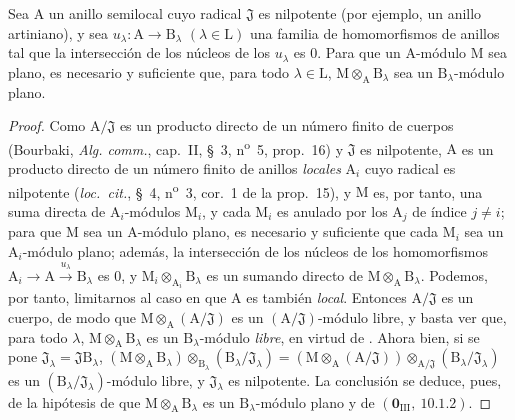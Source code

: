 \begin{corollary}[11.4.3]
\label{IV.11.4.3}
Sea $\mathrm{A}$ un anillo semilocal cuyo radical $\mathfrak{J}$ es nilpotente (por
ejemplo, un anillo artiniano), y sea $u_\lambda:\mathrm{A}\to\mathrm{B}_\lambda$ $(\lambda\in\mathrm{L})$ una familia de homomorfismos de anillos tal
que la intersección de los núcleos de los $u_\lambda$ es $0$. Para que un $\mathrm{A}$-módulo $\mathrm{M}$ sea plano, es necesario y
suficiente que, para todo $\lambda\in\mathrm{L}$, $\mathrm{M}\otimes_\mathrm{A}\mathrm{B}_\lambda$ sea un $\mathrm{B}_\lambda$-módulo plano.
\end{corollary}

\begin{proof}
Como $\mathrm{A}/\mathfrak{J}$ es un producto directo de un número finito de cuerpos (Bourbaki, \emph{Alg. comm.},
cap.~II, \S~3, n\textsuperscript{o}~5, prop.~16) y $\mathfrak{J}$ es nilpotente, $\mathrm{A}$ es un producto directo de un
número finito de anillos \emph{locales} $\mathrm{A}_i$ cuyo radical es nilpotente (\emph{loc.\ cit.}, \S~4, n\textsuperscript{o}~3, cor.~1
de la prop.~15), y $\mathrm{M}$ es, por tanto, una suma directa de $\mathrm{A}_i$-módulos $\mathrm{M}_i$, y cada $\mathrm{M}_i$ es
anulado por los $\mathrm{A}_j$ de índice $j\neq i$; para que $\mathrm{M}$ sea un $\mathrm{A}$-módulo plano, es necesario y
suficiente que cada $\mathrm{M}_i$ sea un $\mathrm{A}_i$-módulo plano; además, la intersección de los núcleos
de los homomorfismos $\mathrm{A}_i\longrightarrow\mathrm{A}\xrightarrow{u_\lambda}\mathrm{B}_\lambda$ es $0$, y $\mathrm{M}_i\otimes_{\mathrm{A}_i}\mathrm{B}_\lambda$ es un sumando directo
de $\mathrm{M}\otimes_\mathrm{A}\mathrm{B}_\lambda$. Podemos, por tanto, limitarnos al caso en que $\mathrm{A}$ es también \emph{local}. Entonces $\mathrm{A}/\mathfrak{J}$ es un
cuerpo, de modo que $\mathrm{M}\otimes_\mathrm{A}(\mathrm{A}/\mathfrak{J})$ es un $(\mathrm{A}/\mathfrak{J})$-módulo libre, y basta ver que, para
todo $\lambda$, $\mathrm{M}\otimes_\mathrm{A}\mathrm{B}_\lambda$ es un $\mathrm{B}_\lambda$-módulo \emph{libre}, en virtud de . Ahora bien, si se pone $\mathfrak{J}_\lambda=\mathfrak{J}\mathrm{B}_\lambda$,
$(\mathrm{M}\otimes_\mathrm{A}\mathrm{B}_\lambda)\otimes_{\mathrm{B}_\lambda}(\mathrm{B}_\lambda/\mathfrak{J}_\lambda)=(\mathrm{M}\otimes_\mathrm{A}(\mathrm{A}/\mathfrak{J}))\otimes_{\mathrm{A}/\mathfrak{J}}(\mathrm{B}_\lambda/\mathfrak{J}_\lambda)$ es un $(\mathrm{B}_\lambda/\mathfrak{J}_\lambda)$-módulo libre, y $\mathfrak{J}_\lambda$ es
nilpotente. La conclusión se deduce, pues, de la hipótesis de que $\mathrm{M}\otimes_\mathrm{A}\mathrm{B}_\lambda$ es un $\mathrm{B}_\lambda$-módulo
plano y de $(\mathbf{0}_{\mathrm{III}},~10.1.2)$.
\end{proof}

